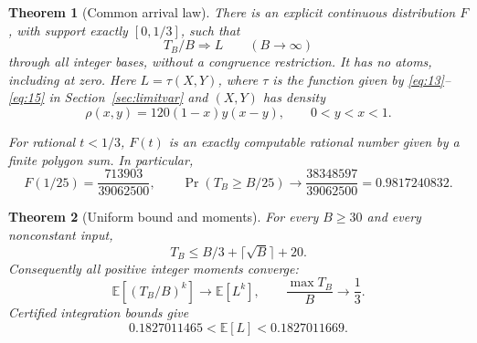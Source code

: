 \documentclass[11pt]{amsart}
\newtheorem{theorem}{Theorem}
\begin{document}
\begin{theorem}[Common arrival law]\label{thm:1}
There is an explicit continuous distribution \(F\), with support exactly \([0,1/3]\), such that \[T_B/B\Rightarrow L\qquad(B\longrightarrow\infty)\] through all integer bases, without a congruence restriction. It has no atoms, including at zero. Here \(L=\tau(X,Y)\), where \(\tau\) is the function given by \eqref{eq:13}--\eqref{eq:15} in Section~\ref{sec:limitvar} and \((X,Y)\) has density \begin{equation}\label{eq:1}
\rho(x,y)=120(1-x)y(x-y),\qquad 0<y<x<1.
\end{equation}

For rational \(t<1/3\), \(F(t)\) is an exactly computable rational number given by a finite polygon sum. In particular, \begin{equation}\label{eq:2}
F(1/25)=\frac{713903}{39062500},\qquad
 \Pr(T_B\ge B/25)\longrightarrow
 \frac{38348597}{39062500}=0.9817240832.
\end{equation}
\end{theorem}

\begin{theorem}[Uniform bound and moments]\label{thm:2}
For every \(B\ge30\) and every nonconstant input, \begin{equation}\label{eq:3}
T_B\le B/3+\lceil\sqrt B\rceil+20.
\end{equation} Consequently all positive integer moments converge: \begin{equation}\label{eq:4}
\mathbb E[(T_B/B)^k]\longrightarrow\mathbb E[L^k],
 \qquad
 \frac{\max T_B}{B}\longrightarrow\frac13.
\end{equation} Certified integration bounds give \begin{equation}\label{eq:5}
0.1827011465<\mathbb E[L]<0.1827011669.
\end{equation}
\end{theorem}
\end{document}
